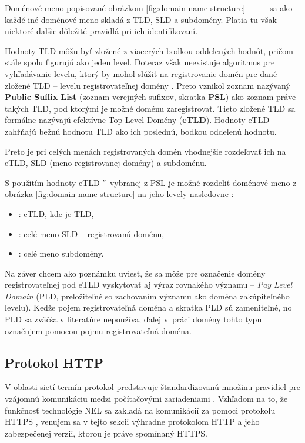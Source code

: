 Doménové meno popisované obrázkom \ref{fig:domain-name-structure} ---  --- sa ako každé iné doménové meno skladá z TLD, SLD a subdomény. 
Platia tu však niektoré ďalšie dôležité pravidlá pri ich identifikovaní.

Hodnoty TLD môžu byť zložené z viacerých bodkou oddelených hodnôt, pričom stále spolu figurujú ako jeden level.
Doteraz však neexistuje algoritmus pre vyhľadávanie levelu, ktorý by mohol slúžiť na registrovanie domén pre dané zložené TLD -- levelu registrovateľnej domény \cite{mozilla-psl-learn}.
Preto vznikol zoznam nazývaný \textbf{Public Suffix List} (zoznam verejných sufixov, skratka \textbf{PSL}) ako zoznam práve takých TLD, pod ktorými je možné doménu zaregistrovať.
Tieto zložené TLD sa formálne nazývajú efektívne Top Level Domény (\textbf{eTLD}).
Hodnoty eTLD zahŕňajú bežnú hodnotu TLD ako ich poslednú, bodkou oddelenú hodnotu.

\pagebreak

\noindent Preto je pri celých menách registrovaných domén vhodnejšie rozdeľovať ich na eTLD, SLD (meno registrovanej domény) a subdoménu.

S použitím hodnoty eTLD '' vybranej z PSL je možné rozdeliť doménové meno z obrázka \ref{fig:domain-name-structure} na jeho levely nasledovne \cite{michal-spacek-etld-article}: 
\begin{itemize}
    \item {}: eTLD, kde  je TLD,
    \item {}: celé meno SLD -- registrovanú doménu,
    \item {}: celé meno subdomény.
\end{itemize}

Na záver chcem ako poznámku uviesť, že sa môže pre označenie domény registrovateľnej pod eTLD vyskytovať aj výraz rovnakého významu 
-- \textit{Pay Level Domain} (PLD, preložiteľné so zachovaním významu ako doména zakúpiteľného levelu).
Keďže pojem registrovateľná doména a skratka PLD sú zameniteľné, no PLD sa zväčša v literatúre nepoužíva, 
ďalej \mbox{v práci} domény tohto typu označujem pomocou pojmu registrovateľná doména.


\subsection{Protokol HTTP}
\label{protokol-http}

V oblasti sietí termín protokol predstavuje štandardizovanú množinu pravidiel pre vzájomnú komunikáciu medzi počítačovými zariadeniami \cite{cloudflare-protocol}.
Vzhľadom na to, že funkčnosť technológie NEL sa zakladá na komunikácií za pomoci protokolu HTTPS  \cite{nel-client-side-measurement-e2e-reliability},
venujem sa v tejto sekcii výhradne protokolom HTTP a jeho zabezpečenej verzii, ktorou je práve spomínaný HTTPS.

